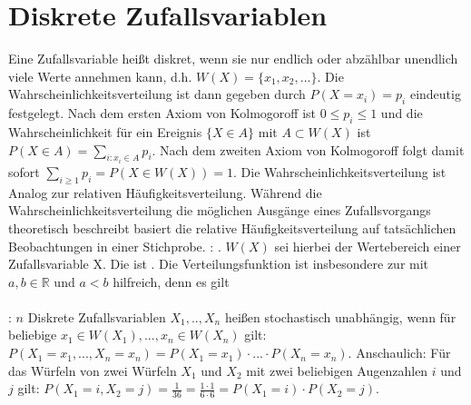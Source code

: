 \section{Diskrete Zufallsvariablen}
Eine Zufallsvariable heißt diskret, wenn sie nur endlich oder abzählbar unendlich viele Werte annehmen kann, d.h. $W(X) = \{x_1, x_2, ...\}$. Die Wahrscheinlichkeitsverteilung ist dann gegeben durch $P(X = x_i) = p_i$ eindeutig festgelegt. Nach dem ersten Axiom von Kolmogoroff ist $0 \le p_i \le 1$ und die Wahrscheinlichkeit für ein Ereignis $\{X \in A\}$ mit $A \subset W(X)$ ist $P(X \in A) = \sum_{i:x_i \in A} p_i$. Nach dem zweiten Axiom von Kolmogoroff folgt damit sofort $\sum_{i \ge 1} p_i = P(X \in W(X)) = 1$. Die Wahrscheinlichkeitsverteilung ist Analog zur relativen Häufigkeitsverteilung. Während die Wahrscheinlichkeitsverteilung die möglichen Ausgänge eines Zufallsvorgangs theoretisch beschreibt basiert die relative Häufigkeitsverteilung auf tatsächlichen Beobachtungen in einer Stichprobe.
: . $W(X)$ sei hierbei der Wertebereich einer Zufallsvariable X.
Die  ist . Die Verteilungsfunktion ist insbesondere zur  mit $a, b \in \mathds{R}$ und $a < b$ hilfreich, denn es gilt \\\\
: $n$ Diskrete Zufallsvariablen $X_1, .., X_n$ heißen stochastisch unabhängig, wenn für beliebige $x_1 \in W(X_1), ..., x_n \in W(X_n)$ gilt: $P(X_1 = x_1, ..., X_n = x_n) = P(X_1 = x_1) \cdot ... \cdot P(X_n = x_n)$. Anschaulich: Für das Würfeln von zwei Würfeln  $X_1$ und $X_2$ mit zwei beliebigen Augenzahlen $i$ und $j$ gilt: $P(X_1 = i, X_2 = j) = \frac{1}{36} = \frac{1 \cdot 1}{6 \cdot 6} = P(X_1 = i) \cdot P(X_2 = j)$.


